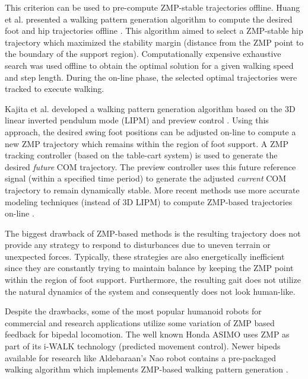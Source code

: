 This criterion can be used to pre-compute ZMP-stable trajectories offline. Huang et al. presented a walking pattern generation algorithm to compute the desired foot and hip trajectories offline \cite{HuangEtAlTRA2001}. This algorithm aimed to select a ZMP-stable hip trajectory which maximized the stability margin (distance from the ZMP point to the boundary of the support region). Computationally expensive exhaustive search was used offline to obtain the optimal solution for a given walking speed and step length. During the on-line phase, the selected optimal trajectories were tracked to execute walking.

Kajita et al. developed a walking pattern generation algorithm based on the 3D linear inverted pendulum mode (LIPM) \cite{Kajita:2001fk} and preview control \cite{KajitaEtAlICRA2003}. Using this approach, the desired swing foot positions can be adjusted on-line to compute a new ZMP trajectory which remains within the region of foot support. A ZMP tracking controller (based on the table-cart system) is used to generate the desired \emph{future} COM trajectory. The preview controller uses this future reference signal (within a specified time period) to generate the adjusted \emph{current} COM trajectory to remain dynamically stable. More recent methods use more accurate modeling techniques (instead of 3D LIPM) to compute ZMP-based trajectories on-line \cite{TakenakaEtAlIROS2009}. 

The biggest drawback of ZMP-based methods is the resulting trajectory does not provide any strategy to respond to disturbances due to uneven terrain or unexpected forces. Typically, these strategies are also energetically inefficient since they are constantly trying to maintain balance by keeping the ZMP point within the region of foot support. Furthermore, the resulting gait does not utilize the natural dynamics of the system and consequently does not look human-like.

Despite the drawbacks, some of the most popular humanoid robots for commercial and research applications utilize some variation of ZMP based feedback for bipedal locomotion. The well known Honda ASIMO \cite{Sakagami:2002cf} uses ZMP as part of its i-WALK technology (predicted movement control). Newer bipeds available for research like Aldebaraan's Nao \cite{Gouaillier2006} robot contains a pre-packaged walking algorithm which implements ZMP-based walking pattern generation \cite{Kajita:2006dx}. 


